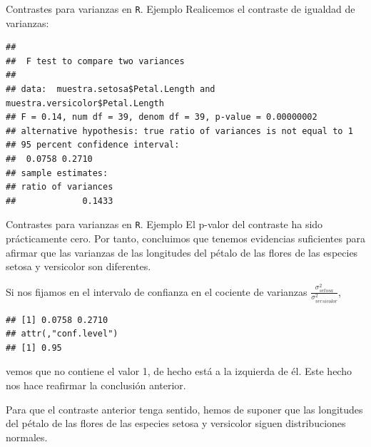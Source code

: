 \documentclass[
  ignorenonframetext,
]{beamer}
\newenvironment{Shaded}{\begin{snugshade}}{\end{snugshade}}
\newcommand{\KeywordTok}[1]{\textcolor[rgb]{0.13,0.29,0.53}{\textbf{#1}}}
\newcommand{\NormalTok}[1]{#1}
\newcommand{\OperatorTok}[1]{\textcolor[rgb]{0.81,0.36,0.00}{\textbf{#1}}}
\begin{document}
\begin{frame}[fragile]{Contrastes para varianzas en \texttt{R}. Ejemplo}
\protect\hypertarget{contrastes-para-varianzas-en-r.-ejemplo-1}{}
Realicemos el contraste de igualdad de varianzas:

\begin{Shaded}
\end{Shaded}

\begin{verbatim}
## 
##  F test to compare two variances
## 
## data:  muestra.setosa$Petal.Length and muestra.versicolor$Petal.Length
## F = 0.14, num df = 39, denom df = 39, p-value = 0.00000002
## alternative hypothesis: true ratio of variances is not equal to 1
## 95 percent confidence interval:
##  0.0758 0.2710
## sample estimates:
## ratio of variances 
##             0.1433
\end{verbatim}
\end{frame}

\begin{frame}[fragile]{Contrastes para varianzas en \texttt{R}. Ejemplo}
\protect\hypertarget{contrastes-para-varianzas-en-r.-ejemplo-2}{}
El p-valor del contraste ha sido prácticamente cero. Por tanto,
concluimos que tenemos evidencias suficientes para afirmar que las
varianzas de las longitudes del pétalo de las flores de las especies
setosa y versicolor son diferentes.

Si nos fijamos en el intervalo de confianza en el cociente de varianzas
\(\frac{\sigma^2_{{ setosa}}}{\sigma^2_{{versicolor}}}\),

\begin{Shaded}
\end{Shaded}

\begin{verbatim}
## [1] 0.0758 0.2710
## attr(,"conf.level")
## [1] 0.95
\end{verbatim}

vemos que no contiene el valor 1, de hecho está a la izquierda de él.
Este hecho nos hace reafirmar la conclusión anterior.

Para que el contraste anterior tenga sentido, hemos de suponer que las
longitudes del pétalo de las flores de las especies setosa y versicolor
siguen distribuciones normales.
\end{frame}
\end{document}
